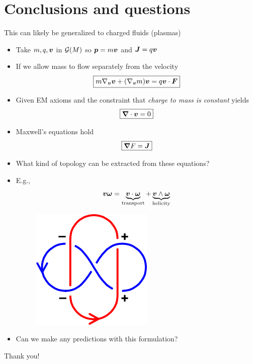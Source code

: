 \documentclass[aspectratio=169]{beamer}
\begin{document}
\section{Conclusions and questions}

\begin{frame}{}
\large This can likely be generalized to charged fluids (plasmas)
\vfill
    
    \begin{itemize}
        \item Take $m,q,\boldsymbol{v}$ in $\mathcal{G}(M)$ so $\boldsymbol{p}=m\boldsymbol{v}$ and $\boldsymbol{J}=q\boldsymbol{v}$
        \item If we allow mass to flow separately from the velocity 
        \[
        \boxed{m\nabla_{\boldsymbol{v}}\boldsymbol{v} + (\nabla_{\boldsymbol{v}}m)\boldsymbol{v} = q\boldsymbol{v} \cdot \boldsymbol{F}}
        \]
        \item Given EM axioms and the constraint that \emph{charge to mass is constant} yields
        \[
        \boxed{\boldsymbol{\nabla} \cdot \boldsymbol{v} = 0}
        \]
        \item Maxwell's equations hold
        \[
        \boxed{\boldsymbol{\nabla} F = \boldsymbol{J}}
        \]
    \end{itemize}
    \vfill
\end{frame}

\begin{frame}{}
\vfill
\begin{itemize}
	\item What kind of topology can be extracted from these equations?
	\item E.g., 
	\[
		\boldsymbol{v} \boldsymbol{\omega} = \underbrace{\boldsymbol{v}\cdot \boldsymbol{\omega}}_{\textrm{transport}} + \underbrace{\boldsymbol{v}\wedge \boldsymbol{\omega}}_{\textrm{helicity}}
	\]
	\begin{figure}[H]
		\centering
		\includegraphics[width=.2\textwidth]{figures/gauss_linking.png}
	\end{figure}
	\item Can we make any predictions with this formulation?
\end{itemize}
\vfill
\end{frame}

\begin{frame}{}
\vfill
\huge \centering Thank you!
\vfill 
\end{frame}
\end{document}
